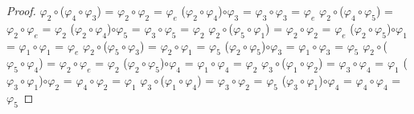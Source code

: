 \documentclass[10pt,a4paper,oneside]{article}
\begin{document}
\begin{proof}
					$\varphi_{2}\circ$($\varphi_{4}\circ\varphi_{3}$) = $\varphi_{2}\circ\varphi_{2}$ = $\varphi_{e}$
					\newline
					($\varphi_{2}\circ\varphi_{4}$)$\circ\varphi_{3}$ = $\varphi_{3}\circ\varphi_{3}$ = $\varphi_{e}$
					\newline
					\newline
					$\varphi_{2}\circ$($\varphi_{4}\circ\varphi_{5}$) = $\varphi_{2}\circ\varphi_{e}$ = $\varphi_{2}$
					\newline
					($\varphi_{2}\circ\varphi_{4}$)$\circ\varphi_{5}$ = $\varphi_{3}\circ\varphi_{5}$ = $\varphi_{2}$
					\newline
					\newline
					$\varphi_{2}\circ$($\varphi_{5}\circ\varphi_{1}$) = $\varphi_{2}\circ\varphi_{2}$ = $\varphi_{e}$
					\newline
					($\varphi_{2}\circ\varphi_{5}$)$\circ\varphi_{1}$ = $\varphi_{1}\circ\varphi_{1}$ = $\varphi_{e}$
					\newline
					\newline
					$\varphi_{2}\circ$($\varphi_{5}\circ\varphi_{3}$) = $\varphi_{2}\circ\varphi_{1}$ = $\varphi_{5}$
					\newline
					($\varphi_{2}\circ\varphi_{5}$)$\circ\varphi_{3}$ = $\varphi_{1}\circ\varphi_{3}$ = $\varphi_{5}$
					\newline
					\newline
					$\varphi_{2}\circ$($\varphi_{5}\circ\varphi_{4}$) = $\varphi_{2}\circ\varphi_{e}$ = $\varphi_{2}$
					\newline
					($\varphi_{2}\circ\varphi_{5}$)$\circ\varphi_{4}$ = $\varphi_{1}\circ\varphi_{4}$ = $\varphi_{2}$
					\newline
					\newline
					$\varphi_{3}\circ$($\varphi_{1}\circ\varphi_{2}$) = $\varphi_{3}\circ\varphi_{4}$ = $\varphi_{1}$
					\newline
					($\varphi_{3}\circ\varphi_{1}$)$\circ\varphi_{2}$ = $\varphi_{4}\circ\varphi_{2}$ = $\varphi_{1}$
					\newline
					\newline
					$\varphi_{3}\circ$($\varphi_{1}\circ\varphi_{4}$) = $\varphi_{3}\circ\varphi_{2}$ = $\varphi_{5}$
					\newline
					($\varphi_{3}\circ\varphi_{1}$)$\circ\varphi_{4}$ = $\varphi_{4}\circ\varphi_{4}$ = $\varphi_{5}$
					\newline
					\newline

\end{proof}
\end{document}
